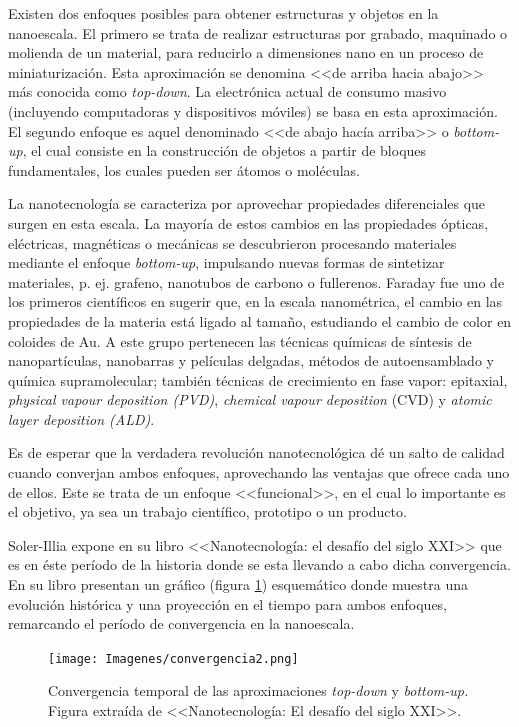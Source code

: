 		Existen dos enfoques posibles para obtener estructuras y objetos en la nanoescala. El primero se trata de realizar estructuras por grabado, maquinado o molienda de un material, para reducirlo a dimensiones nano en un proceso de miniaturización. Esta aproximación se denomina <<de arriba hacia abajo>> más conocida como \textit{top-down}. La electrónica actual de consumo masivo (incluyendo computadoras y dispositivos móviles) se basa en esta aproximación. El segundo enfoque es aquel denominado <<de abajo hacía arriba>> o \textit{bottom-up}, el cual consiste en la construcción de objetos a partir de bloques fundamentales, los cuales pueden ser átomos o moléculas. 

		La nanotecnología se caracteriza por aprovechar propiedades diferenciales que surgen en esta escala. La mayoría de estos cambios en las propiedades ópticas, eléctricas, magnéticas o mecánicas se descubrieron procesando materiales mediante el enfoque \textit{bottom-up}, impulsando nuevas formas de sintetizar materiales, p. ej. grafeno, nanotubos de carbono o fullerenos. Faraday fue uno de los primeros científicos en sugerir que, en la escala nanométrica, el cambio en las propiedades de la materia está ligado al tamaño, estudiando el cambio de color en coloides de Au\cite{faraday1857}. A este grupo pertenecen las técnicas químicas de síntesis de nanopartículas, nanobarras y películas delgadas, métodos de autoensamblado y química supramolecular; también técnicas de crecimiento en fase vapor: epitaxial, \textit{physical vapour deposition (PVD)}, \textit{chemical vapour deposition} (CVD) y \textit{atomic layer deposition (ALD)}.
			
		Es de esperar que la verdadera revolución nanotecnológica dé un salto de calidad cuando converjan ambos enfoques, aprovechando las ventajas que ofrece cada uno de ellos. Este se trata de un enfoque <<funcional>>, en el cual lo importante es el objetivo, ya sea un trabajo científico, prototipo o un producto.

		Soler-Illia expone en su libro <<Nanotecnología: el desafío del siglo XXI>>\cite{nanotecnologia-galo} que es en éste período de la historia donde se esta llevando a cabo dicha convergencia. En su libro presentan un gráfico (figura \ref{fig:galo-convergencia}) esquemático donde muestra una evolución histórica y una proyección en el tiempo para ambos enfoques, remarcando el período de convergencia en la nanoescala.

			\begin{figure}[ht!]
 				\begin{center}
 				\texttt{[image: Imagenes/convergencia2.png]}
 				\caption[Convergencia \textit{top-down }y \textit{bottom-up.}]{Convergencia temporal de las aproximaciones \textit{top-down }y \textit{bottom-up.} Figura extraída de <<Nanotecnología: El desafío del siglo XXI>>.\cite{nanotecnologia-galo}}
 				\label{fig:galo-convergencia}
 		   	    \end{center}
 		   	    \end{figure}

